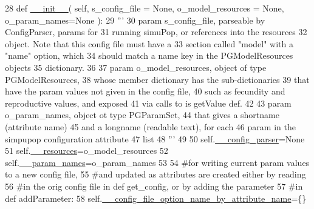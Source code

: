 \begin{DoxyCode}
28     \textcolor{keyword}{def }\hyperlink{classnegui_1_1pginputsimupop_1_1PGInputSimuPop_a1452a83a005c9d30e778b34ae67a399f}{\_\_init\_\_}( self, s\_config\_file = None, o\_model\_resources = None, o\_param\_names=None ):
29         \textcolor{stringliteral}{'''}
30 \textcolor{stringliteral}{        param s\_config\_file, parseable by ConfigParser, params for }
31 \textcolor{stringliteral}{            running simuPop, or references into the resources}
32 \textcolor{stringliteral}{            object.  Note that this config file must have a}
33 \textcolor{stringliteral}{            section called "model" with a "name" option, which}
34 \textcolor{stringliteral}{            should match a name key in the PGModelResources objects}
35 \textcolor{stringliteral}{            dictionary.}
36 \textcolor{stringliteral}{}
37 \textcolor{stringliteral}{        param o\_model\_resources, object of type PGModelResources,}
38 \textcolor{stringliteral}{            whose member dictionary has the sub-dictionaries}
39 \textcolor{stringliteral}{            that have the param values not given in the config file,}
40 \textcolor{stringliteral}{            such as fecundity and reproductive values, and exposed}
41 \textcolor{stringliteral}{            via calls to is getValue def.}
42 \textcolor{stringliteral}{}
43 \textcolor{stringliteral}{        param o\_param\_names, object ot type PGParamSet,}
44 \textcolor{stringliteral}{            that gives a shortname (attribute name)}
45 \textcolor{stringliteral}{            and a longname (readable text), for each }
46 \textcolor{stringliteral}{            param in the simpupop configuration attribute }
47 \textcolor{stringliteral}{            list}
48 \textcolor{stringliteral}{        '''}
49 
50         self.\hyperlink{classnegui_1_1pginputsimupop_1_1PGInputSimuPop_af6628ecaa63a594fc96d1b9273fd1fd6}{\_\_config\_parser}=\textcolor{keywordtype}{None}
51         self.\hyperlink{classnegui_1_1pginputsimupop_1_1PGInputSimuPop_a6c00be5e58b61b239273e04c671cd9e8}{\_\_resources}=o\_model\_resources
52         self.\hyperlink{classnegui_1_1pginputsimupop_1_1PGInputSimuPop_a0a737393cb4d1c66062f9403296c7f19}{\_\_param\_names}=o\_param\_names
53 
54         \textcolor{comment}{#for writing current param values to a new config file,}
55         \textcolor{comment}{#and updated as attributes are created either by reading}
56         \textcolor{comment}{#in the orig config file in def get\_config, or by adding the parameter}
57         \textcolor{comment}{#in def addParameter:}
58         self.\hyperlink{classnegui_1_1pginputsimupop_1_1PGInputSimuPop_a893ab501191e9e1ed89f4f878310d97b}{\_\_config\_file\_option\_name\_by\_attribute\_name}=\{\}      

\end{DoxyCode}
